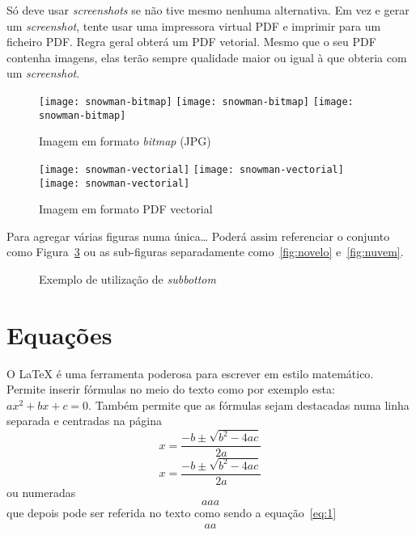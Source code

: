 Só deve usar \emph{screenshots} se não tive mesmo nenhuma alternativa.  Em vez e gerar um \emph{screenshot}, tente usar uma impressora virtual PDF e imprimir para um ficheiro PDF. Regra geral obterá um PDF vetorial. Mesmo que o seu PDF contenha imagens, elas terão sempre qualidade maior ou igual à que obteria com um \emph{screenshot}.


\begin{figure}[htbp]
  \centering
  \texttt{[image: snowman-bitmap]}
  \texttt{[image: snowman-bitmap]}
  \texttt{[image: snowman-bitmap]}
  \caption{Imagem em formato \emph{bitmap} (JPG)}
  \label{fig:Figuras_Tree_silhouettes-bitmap}
\end{figure}

\begin{figure}[htbp]
  \centering
  \texttt{[image: snowman-vectorial]}
  \texttt{[image: snowman-vectorial]}
  \texttt{[image: snowman-vectorial]}
  \caption{Imagem em formato PDF vectorial}
  \label{fig:Figuras_Tree_silhouettes-vectorial}
\end{figure}

Para agregar várias figuras numa única… Poderá assim referenciar o conjunto como Figura~\ref{fig:figura-completa} ou as sub-figuras separadamente como~\ref{fig:novelo} e~\ref{fig:nuvem}.


\begin{figure}[htbp]
  \centering
\qquad\qquad
  \caption{Exemplo de utilização de \emph{subbottom}}
  \label{fig:figura-completa}
\end{figure}

\section{Equações}

O LaTeX é uma ferramenta poderosa para escrever em estilo matemático. Permite inserir fórmulas no meio do texto como por exemplo esta: $ax^2 + bx + c = 0$. Também permite que as fórmulas sejam destacadas numa linha separada e centradas na página
$$x = \frac{-b \pm \sqrt{b^2-4ac}}{2a}$$
\[x = \frac{-b \pm \sqrt{b^2-4ac}}{2a}\]
ou numeradas
\begin{equation}
aaa
\label{eq:1}
\end{equation}
que depois pode ser referida no texto como sendo a equação~\ref{eq:1}
$$\begin{array}{l}
aa
\end{array}
$$

